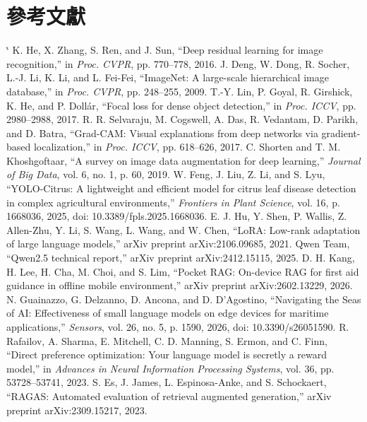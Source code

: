 \documentclass[10pt,twocolumn,a4paper]{article}
\makeatletter
\renewenvironment{thebibliography}[1]
  {\section{參考文獻}%
   \list{\@biblabel{\@arabic\c@enumiv}}%
        {\settowidth\labelwidth{\@biblabel{#1}}%
         \leftmargin\labelwidth
         \advance\leftmargin\labelsep
         \usecounter{enumiv}%
         \let\p@enumiv\@empty
         \renewcommand\theenumiv{\@arabic\c@enumiv}%
         \setlength{\itemsep}{0pt}\setlength{\parsep}{0pt}}%
   \setstretch{1}\fontsize{10}{12}\selectfont\sloppy
   \clubpenalty4000\@clubpenalty\clubpenalty
   \widowpenalty4000\sfcode`\.\@m}
  {\def\@noitemerr{\@latex@warning{Empty `thebibliography' environment}}%
   \endlist}
\makeatother
\begin{document}
\begin{thebibliography}{23}
 K. He, X. Zhang, S. Ren, and J. Sun, ``Deep residual learning for image recognition,'' in \textit{Proc. CVPR}, pp. 770--778, 2016.
 J. Deng, W. Dong, R. Socher, L.-J. Li, K. Li, and L. Fei-Fei, ``ImageNet: A large-scale hierarchical image database,'' in \textit{Proc. CVPR}, pp. 248--255, 2009.
 T.-Y. Lin, P. Goyal, R. Girshick, K. He, and P. Dollár, ``Focal loss for dense object detection,'' in \textit{Proc. ICCV}, pp. 2980--2988, 2017.
 R. R. Selvaraju, M. Cogswell, A. Das, R. Vedantam, D. Parikh, and D. Batra, ``Grad-CAM: Visual explanations from deep networks via gradient-based localization,'' in \textit{Proc. ICCV}, pp. 618--626, 2017.
 C. Shorten and T. M. Khoshgoftaar, ``A survey on image data augmentation for deep learning,'' \textit{Journal of Big Data}, vol. 6, no. 1, p. 60, 2019.
 W. Feng, J. Liu, Z. Li, and S. Lyu, ``YOLO-Citrus: A lightweight and efficient model for citrus leaf disease detection in complex agricultural environments,'' \textit{Frontiers in Plant Science}, vol. 16, p. 1668036, 2025, doi: 10.3389/fpls.2025.1668036.
 E. J. Hu, Y. Shen, P. Wallis, Z. Allen-Zhu, Y. Li, S. Wang, L. Wang, and W. Chen, ``LoRA: Low-rank adaptation of large language models,'' arXiv preprint arXiv:2106.09685, 2021.
 Qwen Team, ``Qwen2.5 technical report,'' arXiv preprint arXiv:2412.15115, 2025.
 D. H. Kang, H. Lee, H. Cha, M. Choi, and S. Lim, ``Pocket RAG: On-device RAG for first aid guidance in offline mobile environment,'' arXiv preprint arXiv:2602.13229, 2026.
 N. Guainazzo, G. Delzanno, D. Ancona, and D. D'Agostino, ``Navigating the Seas of AI: Effectiveness of small language models on edge devices for maritime applications,'' \textit{Sensors}, vol. 26, no. 5, p. 1590, 2026, doi: 10.3390/s26051590.
 R. Rafailov, A. Sharma, E. Mitchell, C. D. Manning, S. Ermon, and C. Finn, ``Direct preference optimization: Your language model is secretly a reward model,'' in \textit{Advances in Neural Information Processing Systems}, vol. 36, pp. 53728--53741, 2023.
 S. Es, J. James, L. Espinosa-Anke, and S. Schockaert, ``RAGAS: Automated evaluation of retrieval augmented generation,'' arXiv preprint arXiv:2309.15217, 2023.
\end{thebibliography}
\end{document}
